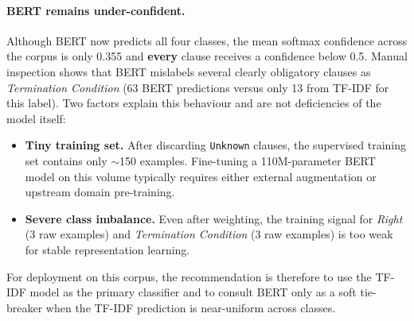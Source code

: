 \documentclass[assignment.tex]{subfiles}
\begin{document}
\paragraph{BERT remains under-confident.}
Although BERT now predicts all four classes, the mean softmax confidence
across the corpus is only 0.355 and \textbf{every} clause receives a
confidence below 0.5.  Manual inspection shows that BERT mislabels several
clearly obligatory clauses as \emph{Termination Condition} (63 BERT
predictions versus only 13 from TF-IDF for this label).
Two factors explain this behaviour and are not deficiencies of the model
itself:
\begin{itemize}[leftmargin=*, itemsep=2pt]
    \item \textbf{Tiny training set.}  After discarding \texttt{Unknown}
          clauses, the supervised training set contains only $\sim$150
          examples.  Fine-tuning a 110M-parameter BERT model on this volume
          typically requires either external augmentation or upstream
          domain pre-training.
    \item \textbf{Severe class imbalance.}  Even after weighting, the
          training signal for \emph{Right} (3 raw examples) and
          \emph{Termination Condition} (3 raw examples) is too weak for
          stable representation learning.
\end{itemize}
For deployment on this corpus, the recommendation is therefore to use the
TF-IDF model as the primary classifier and to consult BERT only as a
soft tie-breaker when the TF-IDF prediction is near-uniform across classes.

\end{document}
